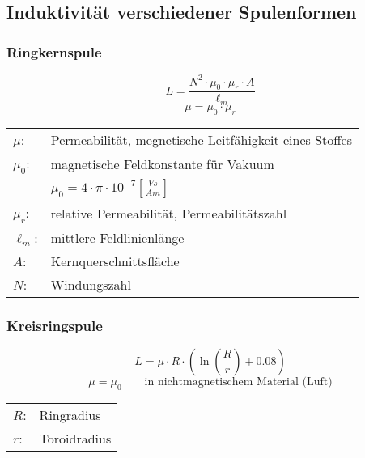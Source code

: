 



\subsection{Induktivität verschiedener Spulenformen}

\subsubsection{Ringkernspule}
\[ L = \frac{N^2 \cdot \mu_0 \cdot \mu_r \cdot A}{\ell_m} \]
\[ \mu = \mu_0 \cdot \mu_r \]
\begin{tabular}{@{}ll}
  $\mu$:    & Permeabilität, megnetische Leitfähigkeit eines Stoffes \\
  $\mu_0$:  & magnetische Feldkonstante für Vakuum \\
            & $\mu_0 = 4 \cdot \pi \cdot 10^{-7} \left[\frac{Vs}{Am}\right]$ \\
  $\mu_r$:  & relative Permeabilität, Permeabilitätszahl \\
  $\ell_m$: & mittlere Feldlinienlänge \\
  $A$:      & Kernquerschnittsfläche \\
  $N$:      & Windungszahl
\end{tabular}

\subsubsection{Kreisringspule}
\[ L = \mu \cdot R \cdot \left(\ln\left(\frac{R}{r}\right) + 0.08\right) \]
\[ \mu = \mu_0 \qquad \text{in nichtmagnetischem Material (Luft)} \]
\begin{tabular}{@{}ll}
  $R$:  & Ringradius \\
  $r$:  & Toroidradius 
\end{tabular}

